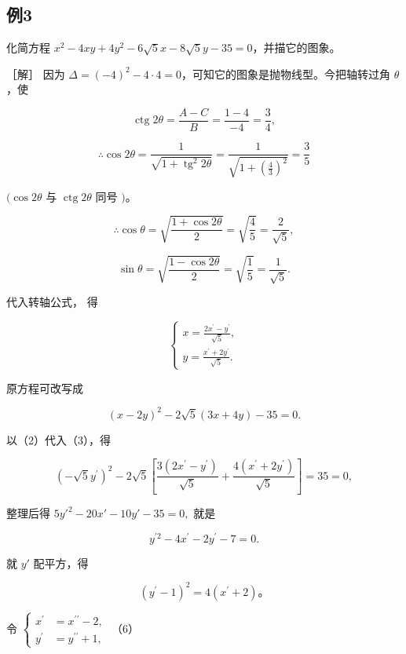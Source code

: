 \subsection{例3}\label{ux4f8b3-24}

化简方程 \(x^{2}-4xy+4y^{2}-6\sqrt{5}x-8\sqrt{5}y-35=0\)，并描它的图象。

［解］ 因为
\(\Delta = (-4)^2 - 4 \cdot 4 = 0\)，可知它的图象是抛物线型。今把轴转过角
\(\theta\)，使

\[
\operatorname{ctg} 2 \theta = \frac {A - C}{B} = \frac {1 - 4}{- 4} = \frac {3}{4}, \tag {1}
\]

\[
\therefore \cos 2 \theta = \frac {1}{\sqrt {1 + \operatorname{tg} ^ {2} 2 \theta}} = \frac {1}{\sqrt {1 + \left(\frac {4}{3}\right) ^ {2}}} = \frac {3}{5}
\]

\((\cos 2\theta\) 与 \(\operatorname{ctg} 2\theta\) 同号 \()\)。

\[
\therefore \cos \theta = \sqrt {\frac {1 + \cos 2 \theta}{2}} = \sqrt {\frac {4}{5}} = \frac {2}{\sqrt {5}},
\]

\[
\sin \theta = \sqrt {\frac {1 - \cos 2 \theta}{2}} = \sqrt {\frac {1}{5}} = \frac {1}{\sqrt {5}}.
\]

代入转轴公式， 得

\[
\left\{ \begin{array}{l} x = \frac {2 x^{\prime} - y^{\prime}}{\sqrt {5}}, \\ y = \frac {x^{\prime} + 2 y^{\prime}}{\sqrt {5}}. \end{array} \right. \tag {2}
\]

原方程可改写成

\[
(x - 2 y) ^ {2} - 2 \sqrt {5} (3 x + 4 y) - 35 = 0. \tag {3}
\]

以（2）代入（3），得

\[
(- \sqrt {5} y^{\prime}) ^ {2} - 2 \sqrt {5} \left[ \frac {3 (2 x^{\prime} - y^{\prime})}{\sqrt {5}} + \frac {4 (x^{\prime} + 2 y^{\prime})}{\sqrt {5}} \right] = 35 = 0,
\]

整理后得 \(5y'^{2}-20x'-10y'-35=0,\) 就是

\[
y^{\prime 2} - 4 x^{\prime} - 2 y^{\prime} - 7 = 0. \tag {4}
\]

就 \(y'\) 配平方，得

\[
(y^{\prime} - 1) ^ {2} = 4 (x^{\prime} + 2)\text{。} \tag {5}
\]

令
\(\left\{\begin{aligned}x^{\prime}&=x^{\prime\prime}-2,\\ y^{\prime}&=y^{\prime\prime}+1,\end{aligned}\right.\)
（6）

